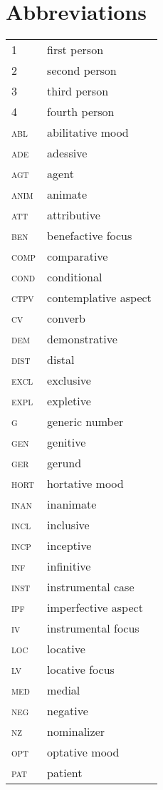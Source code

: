 \chapter*{Abbreviations}

	\begin{longtabu} to 0.8
		1		& first person\\
		2		& second person\\
		3		& third person\\
		4		& fourth person\\
		abl		& abilitative mood\\
		ade		& adessive\\
		agt		& agent\\
		anim	& animate\\
		att		& attributive\\
		ben		& benefactive focus\\
		comp	& comparative\\
		cond	& conditional\\
		ctpv	& contemplative aspect\\
		cv		& converb\\
		dem		& demonstrative\\
		dist	& distal\\
		excl	& exclusive\\
		expl	& expletive\\
		g		& generic number\\
		gen 	& genitive\\
		ger		& gerund\\
		hort	& hortative mood\\
		inan	& inanimate\\
		incl	& inclusive\\
		incp	& inceptive\\
		inf		& infinitive\\
		inst	& instrumental case\\
		ipf		& imperfective aspect\\
		iv		& instrumental focus\\
		loc		& locative\\
		lv		& locative focus\\
		med		& medial\\
		neg		& negative\\
		nz		& nominalizer\\
		opt		& optative mood\\
		pat		& patient\\

\end{longtabu}

